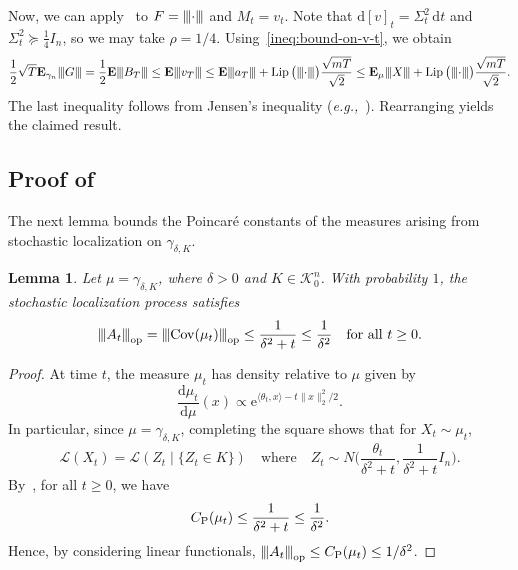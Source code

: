 \documentclass[11pt]{amsart}
\newcommand{\E}{\mathbf E}
\newcommand{\Cov}{\operatorname{Cov}}
\newcommand{\Lip}{\operatorname{Lip}}
\newcommand{\1}{\mathbf 1}
\newcommand{\vertiii}[1]{{\left\vert\kern-0.25ex\left\vert\kern-0.25ex\left\vert #1 
\right\vert\kern-0.25ex\right\vert\kern-0.25ex\right\vert}}
\newcommand{\gauge}[1]{\vertiii{#1}}
\newcommand{\opnorm}[1]{\vertiii{#1}_{\rm op}}
\newcommand{\e}{\mathrm{e}}
\newcommand{\ud}{\mathrm{d}}
\newcommand{\PoinConst}{C_{\rm P}}
\newcommand{\eg}{\emph{e.g.,}}
\newcommand{\Bodies}{\mathcal{K}_0^n}
\newcommand{\cL}{\mathcal{L}}
\theoremstyle{plain}
\newtheorem{lemma}[theorem]{Lemma}
\begin{document}
Now, we can apply~ to $F = \gauge{\cdot}$ and $M_t = v_t$. Note that $\ud [v]_t = \Sigma_t^2 \, \ud t$ and $\Sigma_t^2 \succeq \tfrac{1}{4} I_n$, so we may take $\rho = 1/4$. Using~\eqref{ineq:bound-on-v-t}, we obtain
\begin{equation*}
\frac{1}{2} \sqrt{T} \E_{\gamma_n} \gauge{G} 
= \frac{1}{2} \E \gauge{B_T} \leq \E \gauge{v_T} \leq 
\E \gauge{a_T} + \Lip\big(\gauge{\cdot} \big)\frac{\sqrt{m T}}{\sqrt{2}}
\leq 
\E_\mu \gauge{X} + \Lip\big(\gauge{\cdot} \big)\frac{\sqrt{m T}}{\sqrt{2}}.
\end{equation*}
The last inequality follows from Jensen's inequality (\eg~\cite[ineq.~(55)]{BizKla26}).
Rearranging yields the claimed result.

\subsection{Proof of~\texorpdfstring{}{the eigenvalue stopping-time estimate}}
\label{sec:proof-eigen-stop-upper}

The next lemma bounds the Poincar\'{e} constants of the measures arising from stochastic localization on 
$\gamma_{\delta, K}$. 

\begin{lemma}
\label{lem:computation-for-conditional-measure}
Let $\mu = \gamma_{\delta, K}$, where $\delta > 0$ and $K \in \Bodies$. With probability $1$, the stochastic localization process satisfies
\[
\opnorm{A_t} = \opnorm{\Cov(\mu_t)} 
\leq \frac{1}{\delta^2 + t} \leq \frac{1}{\delta^2}
\quad \mbox{for all}~t \geq 0.
\]    
\end{lemma}
\begin{proof}
At time $t$, the measure $\mu_t$ has density relative to $\mu$ given by
\[
\frac{\ud \mu_t}{\ud \mu}(x) \propto \e^{\langle \theta_t, x\rangle - t\|x\|_2^2/2}.
\]
In particular, since $\mu = \gamma_{\delta, K}$, 
completing the square shows that for $X_t \sim \mu_t$,
\[
\cL(X_t) = \cL(Z_t \mid \{ Z_t \in  K \})
\quad \mbox{where} \quad 
Z_t \sim N\Big(\frac{\theta_t}{\delta^2 + t}, \frac{1}{\delta^2 + t} I_n\Big).
\]
By~, for all $t \geq 0$, we have
\[
\PoinConst(\mu_t) \leq \frac{1}{\delta^2 + t} \leq \frac{1}{\delta^2}. 
\]    
Hence, by considering linear functionals, $\opnorm{A_t} \leq \PoinConst(\mu_t) \leq 1/\delta^2$. 
\end{proof}
\end{document}
